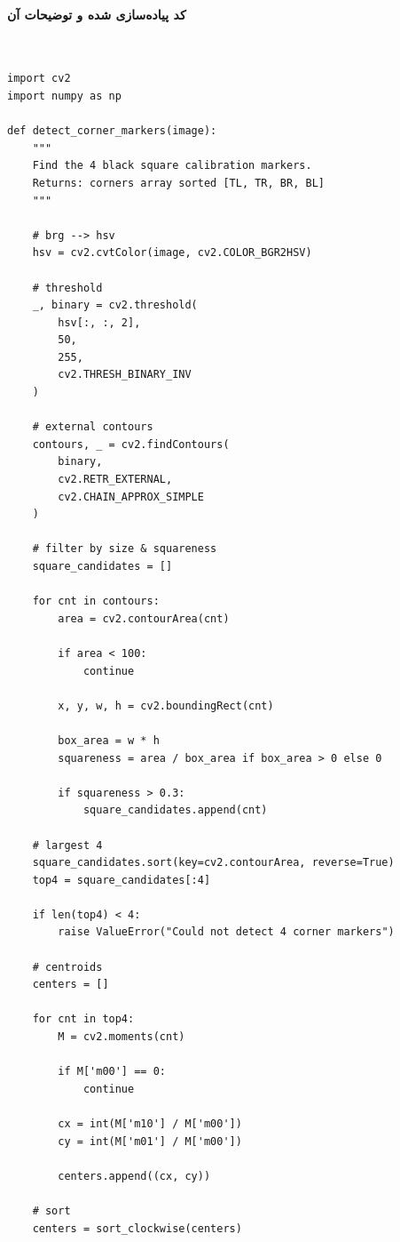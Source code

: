 \documentclass{article}
\begin{document}
\paragraph{کد پیاده‌سازی شده و توضیحات آن}\mbox{}\\
\begin{latin}
\begin{LTR}
\begin{verbatim}
import cv2
import numpy as np

def detect_corner_markers(image):
    """
    Find the 4 black square calibration markers.
    Returns: corners array sorted [TL, TR, BR, BL]
    """

    # brg --> hsv
    hsv = cv2.cvtColor(image, cv2.COLOR_BGR2HSV)

    # threshold 
    _, binary = cv2.threshold(
        hsv[:, :, 2],
        50,
        255,
        cv2.THRESH_BINARY_INV
    )

    # external contours
    contours, _ = cv2.findContours(
        binary,
        cv2.RETR_EXTERNAL,
        cv2.CHAIN_APPROX_SIMPLE
    )

    # filter by size & squareness
    square_candidates = []

    for cnt in contours:
        area = cv2.contourArea(cnt)

        if area < 100:
            continue

        x, y, w, h = cv2.boundingRect(cnt)

        box_area = w * h
        squareness = area / box_area if box_area > 0 else 0

        if squareness > 0.3:
            square_candidates.append(cnt)

    # largest 4
    square_candidates.sort(key=cv2.contourArea, reverse=True)
    top4 = square_candidates[:4]

    if len(top4) < 4:
        raise ValueError("Could not detect 4 corner markers")

    # centroids
    centers = []

    for cnt in top4:
        M = cv2.moments(cnt)

        if M['m00'] == 0:
            continue

        cx = int(M['m10'] / M['m00'])
        cy = int(M['m01'] / M['m00'])

        centers.append((cx, cy))

    # sort
    centers = sort_clockwise(centers)


\end{verbatim}
\end{LTR}
\end{latin}
\end{document}

